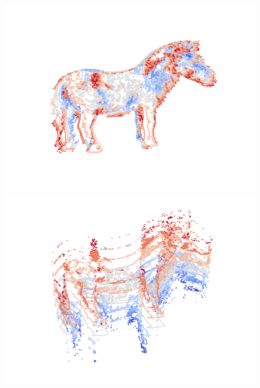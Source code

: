 {\centering
    \includegraphics[scale=0.6]{informe/imagenes/supnivel/supNivelCaballoLucesPropias578N1.pdf} \\
}
{\centering
    \includegraphics[scale=0.6]{informe/imagenes/supnivel/supNivelCaballoLucesPropias578N2.pdf} \\
}
